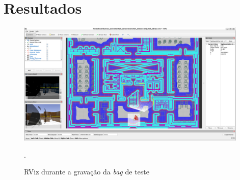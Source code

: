 \documentclass[repeatfields,xlists,xpacks,oneside,yearsonly]{ufrgscca}
\begin{document}
\chapter{Resultados}
\label{resultados}



\begin{figure}[h]
    {
        \centering
        \caption{RViz durante a gravação da \textit{bag} de teste}
        \label{fig:}
        \includegraphics[width=0.98\textwidth]{base_bag_rviz_full.png}\\
    }
    {.}
\end{figure}
\end{document}
